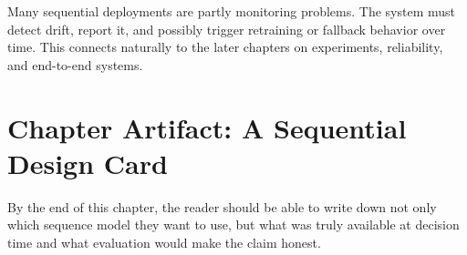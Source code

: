\begin{advancednote}
Many sequential deployments are partly monitoring problems. The system must detect drift, report it, and possibly trigger retraining or fallback behavior over time. This connects naturally to the later chapters on experiments, reliability, and end-to-end systems.
\end{advancednote}

\section{Chapter Artifact: A Sequential Design Card}

By the end of this chapter, the reader should be able to write down not only which sequence model they want to use, but what was truly available at decision time and what evaluation would make the claim honest.

